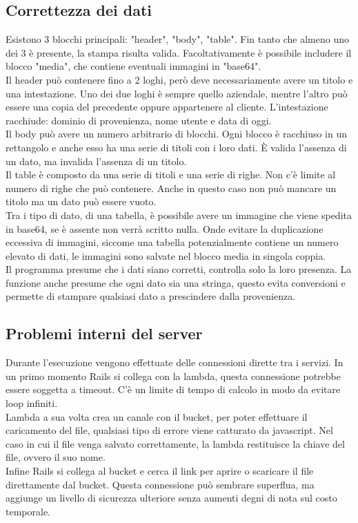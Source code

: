 \documentclass[12pt]{article}
\begin{document}
\subsection{Correttezza dei dati}
Esistono 3 blocchi principali: "header", "body", "table".
Fin tanto che almeno uno dei 3 è presente, la stampa risulta valida.
Facoltativamente è possibile includere il blocco "media", che contiene 
eventuali immagini in "base64". 
\\ Il header può contenere fino a 2 loghi, però deve necessariamente avere 
un titolo e una intestazione. 
Uno dei due loghi è sempre quello aziendale, mentre l'altro può essere una copia 
del precedente oppure appartenere al cliente.
L'intestazione racchiude: dominio di provenienza, nome utente e data di oggi.
\\ Il body può avere un numero arbitrario di blocchi. Ogni blocco è racchiuso 
in un rettangolo e anche esso ha una serie di titoli con i loro dati. 
È valida l'assenza di un dato, ma invalida l'assenza di un titolo. 
\\ Il table è composto da una serie di titoli e una serie di righe. Non c'è limite 
al numero di righe che può contenere.
Anche in questo caso non può mancare un titolo ma un dato può essere vuoto. 
\\ Tra i tipo di dato, di una tabella, 
è possibile avere un immagine che viene spedita in 
base64, se è assente non verrà scritto nulla. Onde evitare la duplicazione 
eccessiva di immagini, siccome una tabella potenzialmente contiene un numero 
elevato di dati, le immagini sono salvate nel blocco media in singola coppia. 
\\ Il programma presume che i dati siano corretti, controlla solo la loro presenza.
La funzione anche presume che ogni dato sia una stringa, questo evita conversioni 
e permette di stampare qualsiasi dato a prescindere dalla provenienza.

\subsection{Problemi interni del server}
Durante l'esecuzione vengono effettuate delle connessioni dirette tra i servizi. 
In un primo momento Rails si collega con la lambda, questa connessione potrebbe 
essere soggetta a timeout. 
C'è un limite di tempo di calcolo in modo da evitare loop infiniti.
\\ Lambda a sua volta crea un canale con il bucket, per poter 
effettuare il caricamento del file, qualsiasi tipo di errore viene catturato da javascript.
Nel caso in cui il file venga salvato correttamente,
la lambda restituisce la chiave del file, ovvero il suo nome. 
\\ Infine Rails si collega al bucket e cerca il link per aprire o scaricare il file 
direttamente dal bucket.
Questa connessione può sembrare superflua, ma aggiunge 
un livello di sicurezza ulteriore senza aumenti degni di nota sul costo temporale. 
\end{document}
